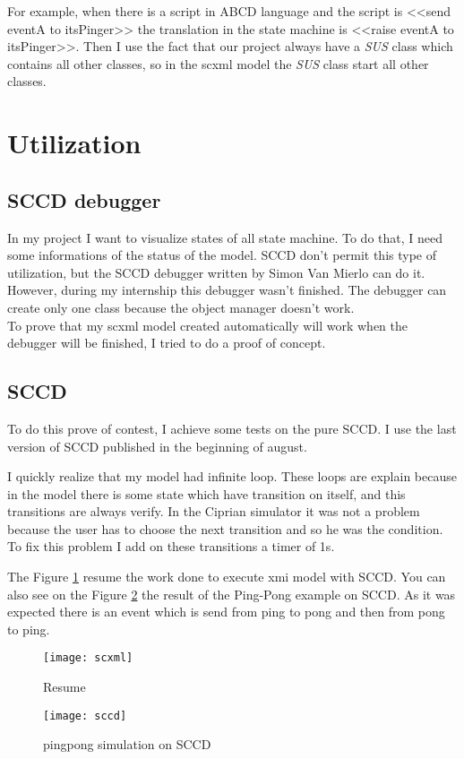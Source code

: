 For example, when there is a script in ABCD language and the script is <<send eventA to itsPinger>> the translation in the state machine is <<raise eventA to itsPinger>>. Then I use the fact that our project always have a \textit{SUS} class which contains all other classes, so in the scxml model the \textit{SUS} class start all other classes.

\section{Utilization}

\subsection{SCCD debugger}

In my project I want to visualize states of all state machine. To do that, I need some informations of the status of the model. SCCD don't permit this type of utilization, but the SCCD debugger written by Simon Van Mierlo can do it.
~\\

However, during my internship this debugger wasn't finished. The debugger can create only one class because the object manager doesn't work.
~\\

To prove that my scxml model created automatically will work when the debugger will be finished, I tried to do a proof of concept. %

\subsection{SCCD}

To do this prove of contest, I achieve some tests on the pure SCCD. I use the last version of SCCD published in the beginning of august.


I quickly realize that my model had infinite loop. These loops are explain because in the model there is some state which have transition on itself, and this transitions are always verify. In the Ciprian simulator it was not a problem because the user has to choose the next transition and so he was the condition. To fix this problem I add on these transitions a timer of 1s.

The Figure \ref{fig:sccd_resume} resume the work done to execute xmi model with SCCD. You can also see on the Figure \ref{fig:sccd} the result of the Ping-Pong example on SCCD. As it was expected there is an event which is send from ping to pong and then from pong to ping.
\begin{figure}[h]
  \centering
  \texttt{[image: scxml]}
  \caption{Resume}
  \label{fig:sccd_resume}
\end{figure}

\begin{figure}[h]
  \centering
  \texttt{[image: sccd]}
  \caption{pingpong simulation on SCCD}
  \label{fig:sccd}
\end{figure}


